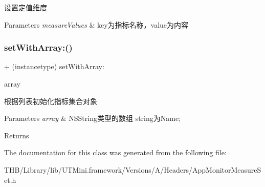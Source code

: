 设置定值维度


\begin{DoxyParams}{Parameters}
{\em measure\+Values} & key为指标名称，value为内容 \\
\hline
\end{DoxyParams}
\mbox{\label{interface_app_monitor_measure_set_af18795825db602c3c568839f8cbc6028}} 
\subsubsection{\texorpdfstring{set\+With\+Array\+:()}{setWithArray:()}}
{\footnotesize\ttfamily + (instancetype) set\+With\+Array\+: \begin{DoxyParamCaption}\item[{(N\+S\+Array $\ast$)}]{array }\end{DoxyParamCaption}}

根据列表初始化指标集合对象


\begin{DoxyParams}{Parameters}
{\em array} & N\+S\+String类型的数组 string为\+Name; \\
\hline
\end{DoxyParams}
\begin{DoxyReturn}{Returns}

\end{DoxyReturn}


The documentation for this class was generated from the following file\+:\begin{DoxyCompactItemize}
\item 
T\+H\+B/\+Library/lib/\+U\+T\+Mini.\+framework/\+Versions/\+A/\+Headers/App\+Monitor\+Measure\+Set.\+h\end{DoxyCompactItemize}
